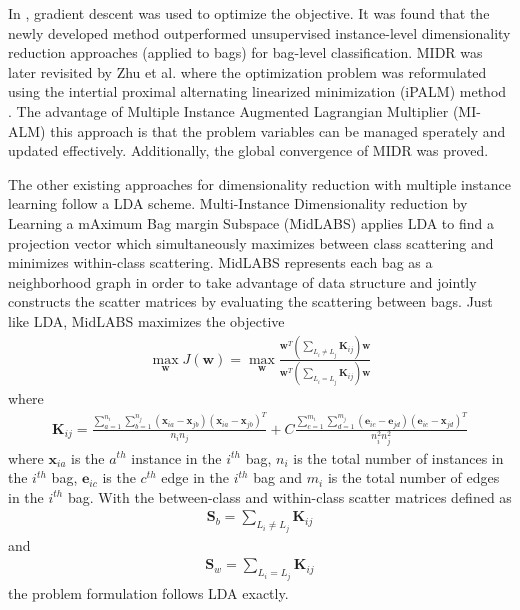 \noindent
In \citep{Sun2010MIDR}, gradient descent was used to optimize the objective.  It was found that the newly developed method outperformed unsupervised instance-level dimensionality reduction approaches (applied to bags) for bag-level classification.  MIDR was later revisited by Zhu et al. where the optimization problem was reformulated using the intertial proximal alternating linearized minimization (iPALM) method \citep{Zhu2018MIDRSparsity}.  The advantage of Multiple Instance Augmented Lagrangian Multiplier (MI-ALM) this approach is that the problem variables can be managed sperately and updated effectively.  Additionally, the global convergence of MIDR was proved. 

The other existing approaches for dimensionality reduction with multiple instance learning follow a LDA scheme.  Multi-Instance Dimensionality reduction by Learning a mAximum Bag margin Subspace (MidLABS) \citep{Ping2010MILDRMaxMargin} applies LDA to find a projection vector which simultaneously maximizes between class scattering and minimizes within-class scattering.  MidLABS represents each bag as a neighborhood graph in order to take advantage of data structure and jointly constructs  the scatter matrices by evaluating the scattering between bags. Just like LDA, MidLABS maximizes the objective
\begin{align}
	\max_{\bm{w}} J(\bm{w})= \max_{\bm{w}} \frac{\bm{w}^{T}(\sum_{L_{i} \neq L_{j}}\bm{K}_{ij})\bm{w}}{\bm{w}^{T}(\sum_{L_{i} = L_{j}}\bm{K}_{ij})\bm{w}}
\end{align}  
\noindent
where 
\begin{align}
	\bm{K}_{ij} = \frac{\sum_{a=1}^{n_{i}}\sum_{b=1}^{n_{j}} (\bm{x}_{ia} - \bm{x}_{jb})(\bm{x}_{ia} - \bm{x}_{jb})^{T}  }{n_{i}n_{j}} + C\frac{\sum_{c=1}^{m_{i}}\sum_{d=1}^{m_{j}} (\bm{e}_{ic} - \bm{e}_{jd})(\bm{e}_{ic} - \bm{x}_{jd})^{T}  }{n_{i}^{2}n_{j}^{2}}
\end{align}
\noindent
\noindent
where $\bm{x}_{ia}$ is the $a^{th}$ instance in the $i^{th}$ bag, $n_i$ is the total number of instances in the $i^{th}$ bag, $\bm{e}_{ic}$ is the $c^{th}$ edge in the $i^{th}$ bag and $m_{i}$ is the total number of edges in the $i^{th}$ bag.  With the between-class and within-class scatter matrices defined as
\begin{align}
	\bm{S}_{b} = \sum_{L_{i} \neq L_{j}}\bm{K}_{ij}
\end{align}
\noindent
and
\begin{align}
	\bm{S}_{w} = \sum_{L_{i} = L_{j}}\bm{K}_{ij}
\end{align}
\noindent
the problem formulation follows LDA exactly.

